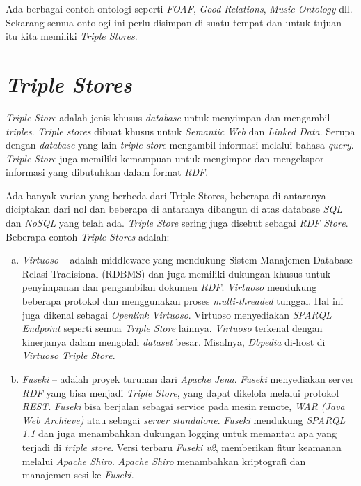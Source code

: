 Ada berbagai contoh ontologi seperti \emph{FOAF}, \emph{Good Relations}, \emph{Music Ontology} dll. Sekarang semua ontologi ini perlu disimpan di suatu tempat dan untuk tujuan itu kita memiliki \emph{Triple Stores}.

\section{\emph{Triple Stores}}
\emph{Triple Store} adalah jenis khusus \emph{database} untuk menyimpan dan mengambil \emph{triples}. \emph{Triple stores} dibuat khusus untuk \emph{Semantic Web} dan \emph{Linked Data}. Serupa dengan \emph{database} yang lain \emph{triple store} mengambil informasi melalui bahasa \emph{query}. \emph{Triple Store} juga memiliki kemampuan untuk mengimpor dan mengekspor informasi yang dibutuhkan dalam format \emph{RDF}.

Ada banyak varian yang berbeda dari Triple Stores, beberapa di antaranya diciptakan dari nol dan beberapa di antaranya dibangun di atas database \emph{SQL} dan \emph{NoSQL} yang telah ada. \emph{Triple Store} sering juga disebut sebagai \emph{RDF Store}. Beberapa contoh \emph{Triple Stores} adalah:

\begin{enumerate}[a.]
	\item \emph{Virtuoso} -- adalah middleware yang mendukung Sistem Manajemen Database Relasi Tradisional (RDBMS) dan juga memiliki dukungan khusus untuk penyimpanan dan pengambilan dokumen \emph{RDF}. \emph{Virtuoso} mendukung beberapa protokol dan menggunakan proses \emph{multi-threaded} tunggal. Hal ini juga dikenal sebagai \emph{Openlink Virtuoso}. Virtuoso menyediakan \emph{SPARQL Endpoint} seperti semua \emph{Triple Store} lainnya. \emph{Virtuoso} terkenal dengan kinerjanya dalam mengolah \emph{dataset} besar. Misalnya, \emph{Dbpedia} di-host di \emph{Virtuoso Triple Store}.
	\item \emph{Fuseki} -- adalah proyek turunan dari \emph{Apache Jena}. \emph{Fuseki} menyediakan server \emph{RDF} yang bisa menjadi \emph{Triple Store}, yang dapat dikelola melalui protokol \emph{REST}. \emph{Fuseki} bisa berjalan sebagai service pada mesin remote, \emph{WAR (Java Web Archieve)} atau sebagai \emph{server standalone}. \emph{Fuseki} mendukung \emph{SPARQL 1.1} dan juga menambahkan dukungan logging untuk memantau apa yang terjadi di \emph{triple store}. Versi terbaru \emph{Fuseki v2}, memberikan fitur keamanan melalui \emph{Apache Shiro}. \emph{Apache Shiro} menambahkan kriptografi dan manajemen sesi ke \emph{Fuseki}. 
\end{enumerate}


